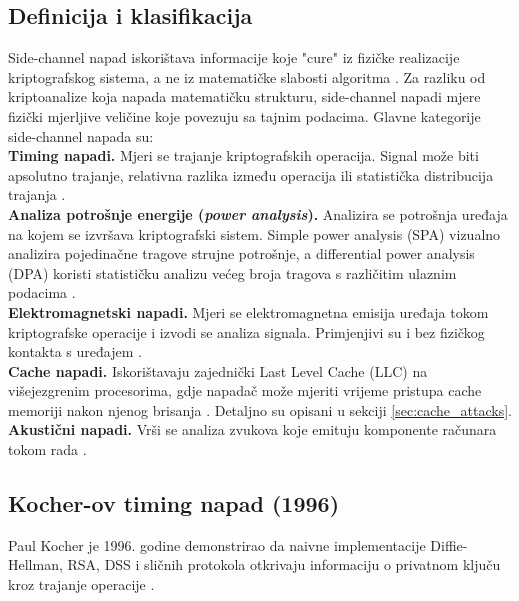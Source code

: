 \subsection{Definicija i klasifikacija}

Side-channel napad iskorištava informacije koje "cure" iz fizičke realizacije kriptografskog sistema, a ne iz matematičke slabosti algoritma \cite{mangard2007}. Za razliku od kriptoanalize koja napada matematičku strukturu, side-channel napadi mjere fizički mjerljive veličine koje povezuju sa tajnim podacima. Glavne kategorije side-channel napada su:
\\

\textbf{Timing napadi.}
Mjeri se trajanje kriptografskih operacija. Signal može biti apsolutno trajanje, relativna razlika između operacija ili statistička distribucija trajanja \cite{kocher1996}.
\\

\textbf{Analiza potrošnje energije (\textit{power analysis}).}
Analizira se potrošnja uređaja na kojem se izvršava kriptografski sistem. Simple power analysis (SPA) vizualno analizira pojedinačne tragove strujne potrošnje, a differential power analysis (DPA) koristi statističku analizu većeg broja tragova s različitim ulaznim podacima \cite{kocher1999}.
\\

\textbf{Elektromagnetski napadi.}
Mjeri se elektromagnetna emisija uređaja tokom kriptografske operacije i izvodi se analiza signala. Primjenjivi su i bez fizičkog kontakta s uređajem \cite{gandolfi2001}.
\\

\textbf{Cache napadi.}
Iskorištavaju zajednički Last Level Cache (LLC) na višejezgrenim procesorima, gdje napadač može mjeriti vrijeme pristupa cache memoriji nakon njenog brisanja \cite{yarom2014}. Detaljno su opisani u sekciji \ref{sec:cache_attacks}.
\\

\textbf{Akustični napadi.}
Vrši se analiza zvukova koje emituju komponente računara tokom rada \cite{genkin2014}.

\subsection{Kocher-ov timing napad (1996)}
\label{sec:kocher}

Paul Kocher je 1996. godine demonstrirao da naivne implementacije Diffie-Hellman, RSA, DSS i sličnih protokola otkrivaju informaciju o privatnom ključu kroz trajanje operacije \cite{kocher1996}.

